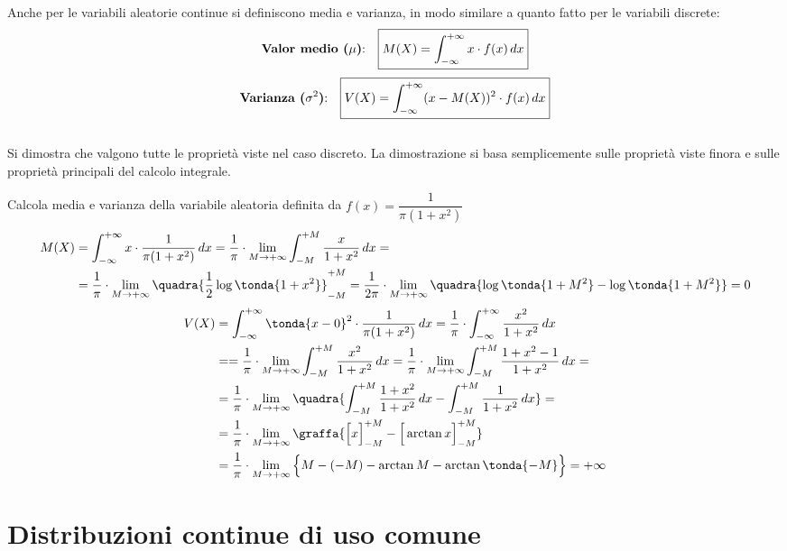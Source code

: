 Anche per le variabili aleatorie continue si definiscono media e varianza, in modo similare a quanto fatto per le variabili discrete:
\[\text{\textbf{Valor medio (\(\mu\))}:}\quad  \boxed{M(X) = \int_{-\infty}^{+\infty} x \cdot f(x) \, dx}  \]
\[\text{\textbf{Varianza (\(\sigma^2\))}:}\quad  \boxed{V(X) = \int_{-\infty}^{+\infty} (x- M(X))^2 \cdot f(x) \, dx}\]\\[4pt]
Si dimostra che valgono tutte le proprietà viste nel caso discreto. La dimostrazione si basa semplicemente sulle proprietà viste finora e sulle proprietà principali del calcolo integrale.

\begin{esempio} Calcola media e varianza della variabile aleatoria definita da \(f(x) = \dfrac{1}{\pi (1+x^2)}\)
\[\begin{split}M(X) &= \int_{-\infty}^{+\infty} x\cdot \dfrac{1}{\pi (1+x^2)} \, dx =  \dfrac{1}{\pi}\cdot  \lim_{M \rightarrow +\infty} \int_{-M}^{+M} \dfrac{x}{1+x^2} \,dx = \\
&= \dfrac{1}{\pi}\cdot  \lim_{M \rightarrow +\infty} \quadra{\dfrac{1}{2} \log \tonda{1+x^2}}_{-M}^{+M} =   \dfrac{1}{2 \pi}\cdot  \lim_{M \rightarrow +\infty} \quadra{\log \tonda{1+M^2}-\log \tonda{1+M^2}} =0\end{split}\]
\[\begin{split} V(X) &= \int_{-\infty}^{+\infty} \tonda{x-0}^2 \cdot \dfrac{1}{\pi (1+x^2)} \, dx =\dfrac{1}{\pi}\cdot \int_{-\infty}^{+\infty} \dfrac{x^2}{ 1+x^2} \, dx \\&=
=\dfrac{1}{\pi}\cdot  \lim_{M \rightarrow +\infty} \int_{-M}^{+M} \dfrac{x^2}{ 1+x^2} \, dx = \dfrac{1}{\pi}\cdot  \lim_{M \rightarrow +\infty} \int_{-M}^{+M} \dfrac{1+x^2-1}{ 1+x^2} \, dx = \\&=
\dfrac{1}{\pi}\cdot  \lim_{M \rightarrow +\infty} \quadra{\int_{-M}^{+M} \dfrac{1+x^2}{ 1+x^2}\, dx-\int_{-M}^{+M} \dfrac{1}{ 1+x^2}\, dx} = \\&=\dfrac{1}{\pi}\cdot  \lim_{M \rightarrow +\infty} \graffa{\Big[x\Big]_{-M}^{+M} - \Big[\arctan{x}\Big]_{-M}^{+M}} \\ &=   \dfrac{1}{\pi}\cdot  \lim_{M \rightarrow +\infty} \Big\{M-(-M)-\arctan{M}-\arctan{\tonda{-M}}\Big\} = +\infty \end{split}\]
\end{esempio}


\section{Distribuzioni continue di uso comune}
\label{sec:distrib_continue}

